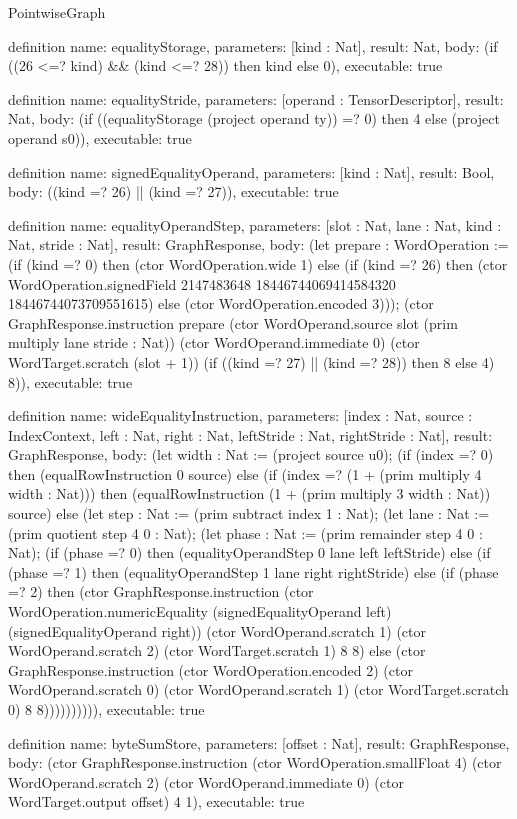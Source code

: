 \begin{lexlean}{PointwiseGraph}
\begin{semanticmodule}
definition{
  name: equalityStorage,
  parameters: [kind : Nat],
  result: Nat,
  body: (if ((26 <=? kind) && (kind <=? 28)) then kind else 0),
  executable: true
}

definition{
  name: equalityStride,
  parameters: [operand : TensorDescriptor],
  result: Nat,
  body: (if ((equalityStorage (project operand ty)) =? 0) then 4 else (project operand s0)),
  executable: true
}

definition{
  name: signedEqualityOperand,
  parameters: [kind : Nat],
  result: Bool,
  body: ((kind =? 26) || (kind =? 27)),
  executable: true
}

definition{
  name: equalityOperandStep,
  parameters: [slot : Nat, lane : Nat, kind : Nat, stride : Nat],
  result: GraphResponse,
  body: (let prepare : WordOperation := (if (kind =? 0) then (ctor WordOperation.wide 1) else (if (kind =? 26) then (ctor WordOperation.signedField 2147483648 18446744069414584320 18446744073709551615) else (ctor WordOperation.encoded 3)));
    (ctor GraphResponse.instruction prepare (ctor WordOperand.source slot (prim multiply lane stride : Nat)) (ctor WordOperand.immediate 0) (ctor WordTarget.scratch (slot + 1)) (if ((kind =? 27) || (kind =? 28)) then 8 else 4) 8)),
  executable: true
}

definition{
  name: wideEqualityInstruction,
  parameters: [index : Nat, source : IndexContext, left : Nat, right : Nat, leftStride : Nat, rightStride : Nat],
  result: GraphResponse,
  body: (let width : Nat := (project source u0);
    (if (index =? 0) then (equalRowInstruction 0 source) else
     (if (index =? (1 + (prim multiply 4 width : Nat))) then (equalRowInstruction (1 + (prim multiply 3 width : Nat)) source) else
      (let step : Nat := (prim subtract index 1 : Nat);
       (let lane : Nat := (prim quotient step 4 0 : Nat);
        (let phase : Nat := (prim remainder step 4 0 : Nat);
         (if (phase =? 0) then (equalityOperandStep 0 lane left leftStride) else
          (if (phase =? 1) then (equalityOperandStep 1 lane right rightStride) else
           (if (phase =? 2) then (ctor GraphResponse.instruction (ctor WordOperation.numericEquality (signedEqualityOperand left) (signedEqualityOperand right)) (ctor WordOperand.scratch 1) (ctor WordOperand.scratch 2) (ctor WordTarget.scratch 1) 8 8)
             else (ctor GraphResponse.instruction (ctor WordOperation.encoded 2) (ctor WordOperand.scratch 0) (ctor WordOperand.scratch 1) (ctor WordTarget.scratch 0) 8 8)))))))))),
  executable: true
}

definition{
  name: byteSumStore,
  parameters: [offset : Nat],
  result: GraphResponse,
  body: (ctor GraphResponse.instruction (ctor WordOperation.smallFloat 4) (ctor WordOperand.scratch 2) (ctor WordOperand.immediate 0) (ctor WordTarget.output offset) 4 1),
  executable: true
}


\end{semanticmodule}
\end{lexlean}
